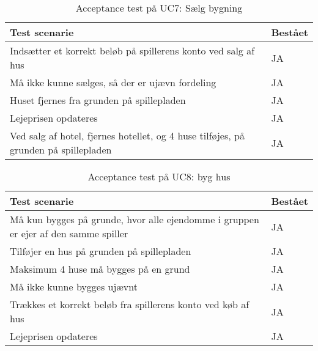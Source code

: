 \documentclass[class=article, crop=false]{standalone}
\begin{document}
    \begin{table}[H]
        \caption{Acceptance test på UC7: Sælg bygning }
        \begin{tabularx}{\textwidth}{|X|l|}
            \hline
            \textbf{Test scenarie}       & \textbf{Bestået}   \\ \hline
            Indsætter et korrekt beløb på spillerens konto ved salg af hus     & JA \\ \hline
            Må ikke kunne sælges, så der er ujævn fordeling     & JA \\ \hline
            Huset fjernes fra grunden på spillepladen     & JA \\ \hline
            Lejeprisen opdateres     & JA\\ \hline
            Ved salg af hotel, fjernes hotellet, og 4 huse tilføjes, på grunden på spillepladen    & JA \\ \hline
        \end{tabularx}
    \end{table}

    \begin{table}[H]
        \caption{Acceptance test på UC8: byg hus}
        \begin{tabularx}{\textwidth}{|X|l|}
            \hline
            \textbf{Test scenarie}       & \textbf{Bestået}   \\ \hline
            Må kun bygges på grunde, hvor alle ejendomme i gruppen er ejer af den samme spiller     & JA \\ \hline
            Tilføjer en hus på grunden på spillepladen     & JA\\ \hline
            Maksimum 4 huse må bygges på en grund     & JA\\ \hline
            Må ikke kunne bygges ujævnt     & JA\\ \hline
            Trækkes et korrekt beløb fra spillerens konto ved køb af hus     & JA\\ \hline
            Lejeprisen opdateres     & JA \\ \hline
        \end{tabularx}
    \end{table}
\end{document}
